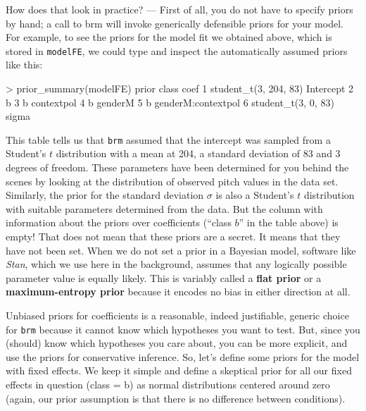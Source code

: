 \documentclass[nobib]{tufte-handout}
\begin{document}
How does that look in practice? --- First of all, you do not have to specify priors by hand; a call to \textrm{brm} will invoke generically defensible priors for your model. For example, to see the priors for the model fit we obtained above, which is stored in \texttt{modelFE}, we could type and inspect the automatically assumed priors like this:

\medskip

\begin{minipage}[]{\textwidth}
\begin{rc}
> prior_summary(modelFE)
                  prior     class               coef 
1 student_t(3, 204, 83) Intercept                    
2                               b                    
3                               b         contextpol 
4                               b            genderM 
5                               b genderM:contextpol 
6   student_t(3, 0, 83)     sigma  
\end{rc}
\end{minipage}

This table tells us that \texttt{brm} assumed that the intercept was sampled from a Student's $t$ distribution with a mean at 204, a standard deviation of 83 and 3 degrees of freedom. These parameters have been determined for you behind the scenes by looking at the distribution of observed pitch values in the data set.
%
%
Similarly, the prior for the standard deviation $\sigma$ is also a Student's $t$ distribution with suitable parameters determined from the data.
But the column with information about the priors over coefficients (``class $b$'' in the table above) is empty!
That does not mean that these priors are a secret.
It means that they have not been set.
When we do not set a prior in a Bayesian model, software like \emph{Stan}, which we use here in the background, assumes that any logically possible parameter value is equally likely.
This is variably called a \textbf{flat prior} or a \textbf{maximum-entropy prior} because it encodes no bias in either direction at all.


Unbiased priors for coefficients is a reasonable, indeed justifiable, generic choice for
\texttt{brm} because it cannot know which hypotheses you want to test. But, since you (should)
know which hypotheses you care about, you can be more explicit, and use the priors for
conservative inference. So, let's define some priors for the model with fixed effects. We keep
it simple and define a skeptical prior for all our fixed effects in
question (class = b) as normal distributions centered around zero (again, our prior assumption
is that there is no difference between conditions).
%
%
\end{document}
